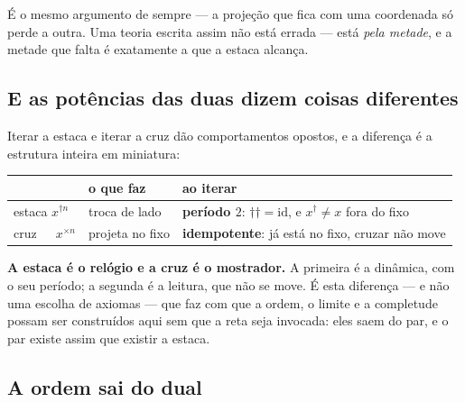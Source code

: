 \documentclass[livro.tex]{subfiles}
\begin{document}

\noindent É o mesmo argumento de sempre --- a projeção que fica com uma coordenada só perde a
outra. Uma teoria escrita assim não está errada --- está \emph{pela metade}, e a metade que falta é
exatamente a que a estaca alcança.

\subsection{E as potências das duas dizem coisas diferentes}\label{sec:potencias}

\noindent Iterar a estaca e iterar a cruz dão comportamentos opostos, e a diferença é a estrutura
inteira em miniatura:

\begin{center}\small
\begin{tabular}{@{}lll@{}}
\toprule
& \textbf{o que faz} & \textbf{ao iterar} \\
\midrule
estaca $x^{\dagger n}$ & troca de lado & \textbf{período $2$}: $\dagger\dagger=\mathrm{id}$, e
$x^{\dagger}\neq x$ fora do fixo \\
cruz\ \ \ $x^{\times n}$ & projeta no fixo & \textbf{idempotente}: já está no fixo, cruzar não move \\
\bottomrule
\end{tabular}
\end{center}


\noindent \textbf{A estaca é o relógio e a cruz é o mostrador.} A primeira é a dinâmica, com o seu
período; a segunda é a leitura, que não se move. É esta diferença --- e não uma escolha de
axiomas --- que faz com que a ordem, o limite e a completude possam ser construídos aqui sem que a
reta seja invocada: eles saem do par, e o par existe assim que existir a estaca.

\subsection{A ordem sai do dual}\label{sec:ordemdual}
\end{document}
